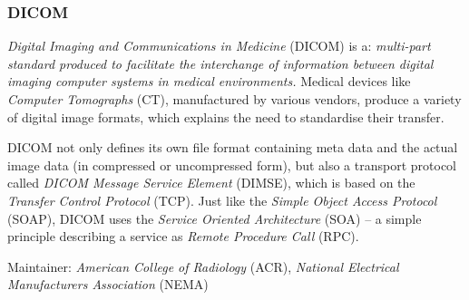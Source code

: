 %
%
%
%
%
%
%

\subsubsection{DICOM}
\label{dicom_heading}

\emph{Digital Imaging and Communications in Medicine} (DICOM) is a:
\textit{multi-part standard produced to facilitate the interchange of
information between digital imaging computer systems in medical environments.}
\cite{dicom} Medical devices like \emph{Computer Tomographs} (CT), manufactured
by various vendors, produce a variety of digital image formats, which explains
the need to standardise their transfer.

DICOM not only defines its own file format containing meta data and the actual
image data (in compressed or uncompressed form), but also a transport protocol
called \emph{DICOM Message Service Element} (DIMSE), which is based on the
\emph{Transfer Control Protocol} (TCP). Just like the
\emph{Simple Object Access Protocol} (SOAP), DICOM uses the
\emph{Service Oriented Architecture} (SOA) -- a simple principle describing a
service as \emph{Remote Procedure Call} (RPC). \cite{kleinschmidt}

Maintainer: \emph{American College of Radiology} (ACR),
\emph{National Electrical Manufacturers Association} (NEMA)
